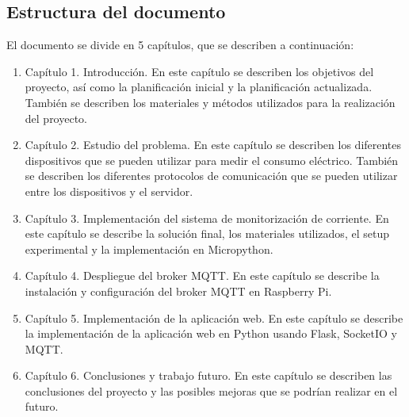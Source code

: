 \begin{titlepage}
\section{Estructura del documento}
El documento se divide en 5 capítulos, que se describen a continuación:
\begin{enumerate}
\item Capítulo 1. Introducción. En este capítulo se describen los objetivos del proyecto, así como la planificación inicial y la planificación actualizada. También se describen los materiales y métodos utilizados para la realización del proyecto. 
\item Capítulo 2. Estudio del problema. En este capítulo se describen los diferentes dispositivos que se pueden utilizar para medir el consumo eléctrico. También se describen los diferentes protocolos de comunicación que se pueden utilizar entre los dispositivos y el servidor.
\item Capítulo 3. Implementación del sistema de monitorización de corriente. En este capítulo se describe la solución final, los materiales utilizados, el setup experimental y la implementación en Micropython.
\item Capítulo 4. Despliegue del broker MQTT. En este capítulo se describe la instalación y configuración del broker MQTT en Raspberry Pi.
\item Capítulo 5. Implementación de la aplicación web. En este capítulo se describe la implementación de la aplicación web en Python usando Flask, SocketIO y MQTT.
\item Capítulo 6. Conclusiones y trabajo futuro. En este capítulo se describen las conclusiones del proyecto y las posibles mejoras que se podrían realizar en el futuro.
\end{enumerate}

\end{titlepage}
